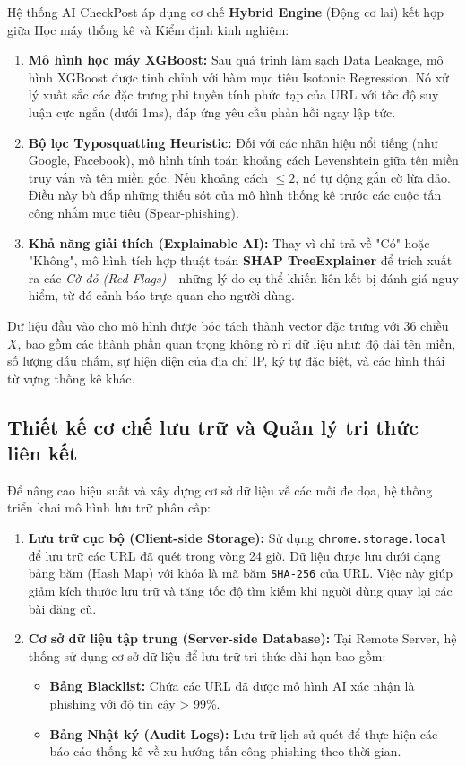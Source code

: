 Hệ thống AI CheckPost áp dụng cơ chế \textbf{Hybrid Engine} (Động cơ lai) kết hợp giữa Học máy thống kê và Kiểm định kinh nghiệm:

\begin{enumerate}
    \item \textbf{Mô hình học máy XGBoost:} Sau quá trình làm sạch Data Leakage, mô hình XGBoost được tinh chỉnh với hàm mục tiêu Isotonic Regression. Nó xử lý xuất sắc các đặc trưng phi tuyến tính phức tạp của URL với tốc độ suy luận cực ngắn (dưới 1ms), đáp ứng yêu cầu phản hồi ngay lập tức.
    \item \textbf{Bộ lọc Typosquatting Heuristic:} Đối với các nhãn hiệu nổi tiếng (như Google, Facebook), mô hình tính toán khoảng cách Levenshtein giữa tên miền truy vấn và tên miền gốc. Nếu khoảng cách $\le 2$, nó tự động gắn cờ lừa đảo. Điều này bù đắp những thiếu sót của mô hình thống kê trước các cuộc tấn công nhắm mục tiêu (Spear-phishing).
    \item \textbf{Khả năng giải thích (Explainable AI):} Thay vì chỉ trả về "Có" hoặc "Không", mô hình tích hợp thuật toán \textbf{SHAP TreeExplainer} để trích xuất ra các \textit{Cờ đỏ (Red Flags)}—những lý do cụ thể khiến liên kết bị đánh giá nguy hiểm, từ đó cảnh báo trực quan cho người dùng.
\end{enumerate}

Dữ liệu đầu vào cho mô hình được bóc tách thành vector đặc trưng với 36 chiều $X$, bao gồm các thành phần quan trọng không rò rỉ dữ liệu như: độ dài tên miền, số lượng dấu chấm, sự hiện diện của địa chỉ IP, ký tự đặc biệt, và các hình thái từ vựng thống kê khác.

\subsection{Thiết kế cơ chế lưu trữ và Quản lý tri thức liên kết}
Để nâng cao hiệu suất và xây dựng cơ sở dữ liệu về các mối đe dọa, hệ thống triển khai mô hình lưu trữ phân cấp:

\begin{enumerate}
    \item \textbf{Lưu trữ cục bộ (Client-side Storage):}
    Sử dụng \texttt{chrome.storage.local} để lưu trữ các URL đã quét trong vòng 24 giờ. Dữ liệu được lưu dưới dạng bảng băm (Hash Map) với khóa là mã băm \texttt{SHA-256} của URL. Việc này giúp giảm kích thước lưu trữ và tăng tốc độ tìm kiếm khi người dùng quay lại các bài đăng cũ.
    
    \item \textbf{Cơ sở dữ liệu tập trung (Server-side Database):}
    Tại Remote Server, hệ thống sử dụng cơ sở dữ liệu để lưu trữ tri thức dài hạn bao gồm:
    \begin{itemize}
        \item \textbf{Bảng Blacklist:} Chứa các URL đã được mô hình AI xác nhận là phishing với độ tin cậy > 99\%.
        \item \textbf{Bảng Nhật ký (Audit Logs):} Lưu trữ lịch sử quét để thực hiện các báo cáo thống kê về xu hướng tấn công phishing theo thời gian.
    \end{itemize}
\end{enumerate}